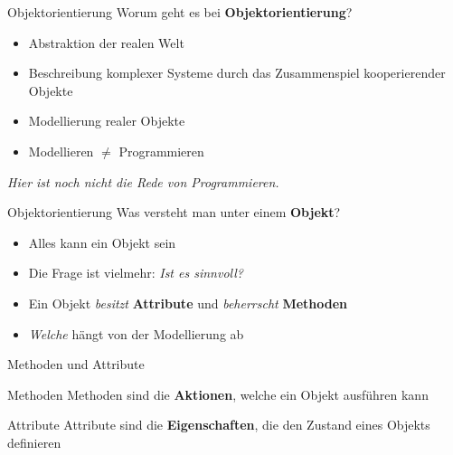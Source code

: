 \documentclass[18pt]{beamer}
\begin{document}
\begin{frame}{Objektorientierung}
    Worum geht es bei \textbf{Objektorientierung}?
    \pause
    \begin{itemize}
        \item Abstraktion der realen Welt
        \pause
        \item Beschreibung komplexer Systeme durch das Zusammenspiel kooperierender Objekte
        \pause
        \item Modellierung realer Objekte
        \pause
        \item Modellieren $\ne$ Programmieren
    \end{itemize}
    \vspace{.2in}
    \textit{Hier ist noch nicht die Rede von Programmieren.}
\end{frame}

\begin{frame}{Objektorientierung}
    Was versteht man unter einem \textbf{Objekt}?
    \pause
    \begin{itemize}
        \item Alles kann ein Objekt sein
        \pause
        \item Die Frage ist vielmehr: \textit{Ist es sinnvoll?}
        \pause
        \item Ein Objekt \textit{besitzt} \textbf{Attribute} und \textit{beherrscht} \textbf{Methoden}
        \pause
        \item \textit{Welche} hängt von der Modellierung ab
    \end{itemize}
\end{frame}

\begin{frame}{Methoden und Attribute}
    \begin{block}{Methoden}
        Methoden sind die \textbf{Aktionen}, welche ein Objekt ausführen kann
    \end{block}
    \pause
    \begin{block}{Attribute}
        Attribute sind die \textbf{Eigenschaften}, die den Zustand eines Objekts definieren
    \end{block}
\end{frame}
\end{document}
